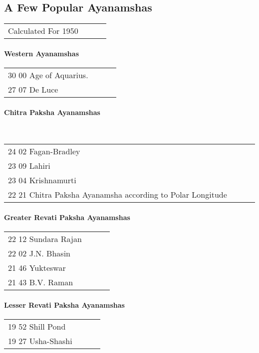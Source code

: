  

 

\subsection{A Few Popular Ayanamshas}

\begin{tabular}{ l l l l}
Calculated For 1950          \\
 \end{tabular}

 

\paragraph{Western Ayanamshas}

\begin{tabular}{ l l l l}
30 00 Age of Aquarius.          \\
27 07 De Luce          \\
  \end{tabular}


\paragraph{Chitra Paksha Ayanamshas}          \\

\begin{tabular}{ l l l l}
24 02 Fagan-Bradley          \\
23 09 Lahiri          \\
23 04 Krishnamurti          \\
22 21 Chitra Paksha Ayanamsha according to Polar Longitude          \\
  \end{tabular}


\paragraph{Greater Revati Paksha Ayanamshas}

\begin{tabular}{ l l l l}
22 12 Sundara Rajan          \\
22 02 J.N. Bhasin          \\
21 46 Yukteswar          \\
21 43 B.V. Raman          \\
  \end{tabular}


\paragraph{Lesser Revati Paksha Ayanamshas}

\begin{tabular}{ l l l l}
19 52 Shill Pond          \\
19 27 Usha-Shashi          \\
 \end{tabular}
